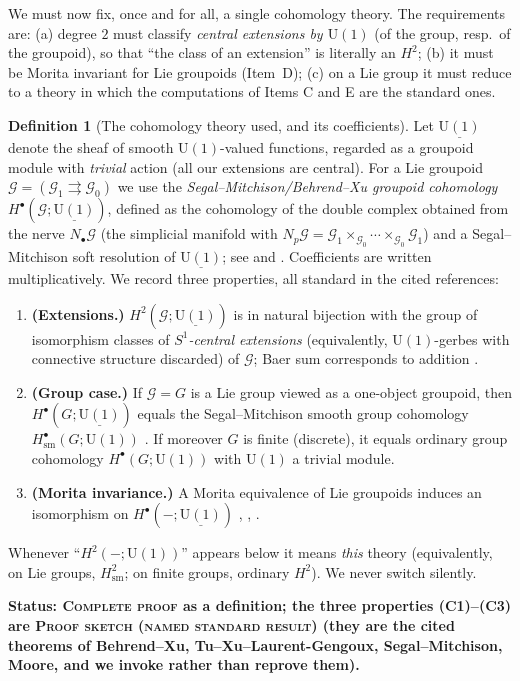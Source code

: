 \documentclass[11pt]{article}
\theoremstyle{definition}
\newtheorem{definition}[theorem]{Definition}
\newcommand{\U}{\mathrm{U}}
\newcommand{\sm}{\mathrm{sm}}
\newcommand{\STAT}[1]{\noindent\textbf{Status: #1}}
\newcommand{\COMPLETE}{\textsc{Complete proof}}
\newcommand{\SKETCH}{\textsc{Proof sketch (named standard result)}}
\begin{document}
We must now fix, once and for all, a single cohomology theory. The requirements are: (a)
degree $2$ must classify \emph{central extensions by $\U(1)$} (of the group, resp.\ of the
groupoid), so that ``the class of an extension'' is literally an $H^2$; (b) it must be
Morita invariant for Lie groupoids (Item~D); (c) on a Lie group it must reduce to a theory
in which the computations of Items C and E are the standard ones.

\begin{definition}[The cohomology theory used, and its coefficients]\label{def:coh}
Let $\underline{\U(1)}$ denote the sheaf of smooth $\U(1)$-valued functions, regarded as a
groupoid module with \emph{trivial} action (all our extensions are central). For a Lie
groupoid $\mathcal G=(\mathcal G_1\rightrightarrows \mathcal G_0)$ we use the
\emph{Segal--Mitchison/Behrend--Xu groupoid cohomology}
$H^{\bullet}(\mathcal G;\underline{\U(1)})$, defined as the cohomology of the double complex
obtained from the nerve $N_{\bullet}\mathcal G$ (the simplicial manifold with
$N_p\mathcal G=\mathcal G_1\times_{\mathcal G_0}\cdots\times_{\mathcal G_0}\mathcal G_1$)
and a Segal--Mitchison soft resolution of $\underline{\U(1)}$; see
\cite[\S2--3]{BehrendXu} and \cite[\S2]{TXL}. Coefficients are written multiplicatively.
We record three properties, all standard in the cited references:
\begin{enumerate}
\item[(C1)] \textbf{(Extensions.)} $H^2(\mathcal G;\underline{\U(1)})$ is in natural
bijection with the group of isomorphism classes of \emph{$S^1$-central extensions}
(equivalently, $\U(1)$-gerbes with connective structure discarded) of $\mathcal G$; Baer
sum corresponds to addition \cite[Thm.~3.9]{BehrendXu}.
\item[(C2)] \textbf{(Group case.)} If $\mathcal G=G$ is a Lie group viewed as a one-object
groupoid, then $H^{\bullet}(G;\underline{\U(1)})$ equals the Segal--Mitchison smooth group
cohomology $H^{\bullet}_{\sm}(G;\U(1))$ \cite{Segal,MooreIII}. If moreover $G$ is finite
(discrete), it equals ordinary group cohomology $H^{\bullet}(G;\U(1))$ with $\U(1)$ a
trivial module.
\item[(C3)] \textbf{(Morita invariance.)} A Morita equivalence of Lie groupoids induces an
isomorphism on $H^{\bullet}(-;\underline{\U(1)})$ \cite[Thm.~3.9, Prop.~3.10]{BehrendXu},
\cite[\S2]{TXL}, \cite[Thm.~4]{Crainic}.
\end{enumerate}
Whenever ``$H^2(-;\U(1))$'' appears below it means \emph{this} theory (equivalently, on
Lie groups, $H^2_{\sm}$; on finite groups, ordinary $H^2$). We never switch silently.
\end{definition}
\STAT{\COMPLETE{} as a definition; the three properties (C1)--(C3) are \SKETCH{} (they are
the cited theorems of Behrend--Xu, Tu--Xu--Laurent-Gengoux, Segal--Mitchison, Moore, and
we invoke rather than reprove them).}
\end{document}
